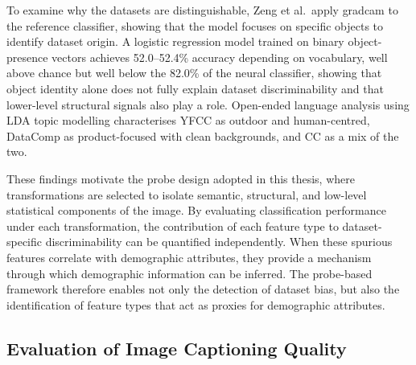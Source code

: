 To examine why the datasets are distinguishable, Zeng et al.\ apply \acrshort{gradcam} to the
reference classifier, showing that the model focuses on specific objects to identify
dataset origin. A logistic regression model trained on binary object-presence vectors
achieves 52.0--52.4\% accuracy depending on vocabulary, well above chance but well below
the 82.0\% of the neural classifier, showing that object identity alone does not fully explain dataset discriminability and that lower-level structural signals also play a role.
Open-ended language analysis using LDA topic modelling characterises YFCC as outdoor and
human-centred, DataComp as product-focused with clean backgrounds, and CC as a mix of the
two.

These findings motivate the probe design adopted in this thesis, where
transformations are selected to isolate semantic, structural, and low-level statistical
components of the image. By evaluating classification performance under each transformation, the contribution of
each feature type to dataset-specific discriminability can be quantified independently.
When these spurious features correlate with demographic attributes, they provide a mechanism through which demographic information can be inferred. The probe-based framework therefore enables not only the detection of dataset bias, but also the identification of feature types that act as proxies for demographic attributes.

\subsection*{Evaluation of Image Captioning Quality}
\label{subsec:captioning_metrics}

